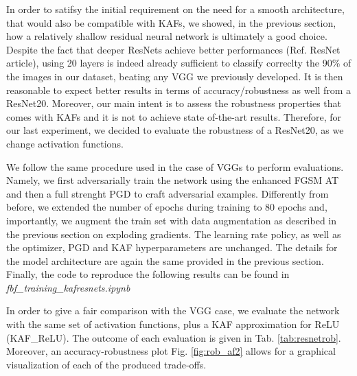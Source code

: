 \documentclass[LaM,binding=0.6cm]{./packages/sapthesis/sapthesis}
\begin{document}
        In order to satifsy the initial requirement on the need for a smooth architecture, that would also be compatible with KAFs, we showed, in the previous section, how a relatively shallow residual neural network is 
        ultimately a good choice. Despite the fact that deeper ResNets achieve better performances (Ref. ResNet article), using 20 layers is indeed already sufficient to classify correclty the 90\% of the images in our dataset, beating 
        any VGG we previously developed. It is then reasonable to expect better results in terms of accuracy/robustness as well from a ResNet20. Moreover, our main intent is to assess the robustness properties that comes with 
        KAFs and it is not to achieve state of-the-art results. Therefore, for our last experiment, we decided to evaluate the robustness of a ResNet20, as we change activation functions.

        We follow the same procedure used in the case of VGGs to perform evaluations. Namely, we first adversarially train the network using the enhanced FGSM AT and then a full strenght PGD to craft adversarial examples.
        Differently from before, we extended the number of epochs during training to 80 epochs and, importantly, we augment the train set with data augmentation as described in the previous section on exploding gradients.
        The learning rate policy, as well as the optimizer, PGD and KAF hyperparameters are unchanged. The details for the model architecture 
        are again the same provided in the previous section. Finally, the code to reproduce the following results can be found in \textit{fbf\_training\_kafresnets.ipynb}

        In order to give a fair comparison with the VGG case, we evaluate the network with the same set of activation functions, plus 
        a KAF approximation for ReLU (KAF\_ReLU). The outcome of each evaluation is given in Tab. \ref{tab:resnetrob}. Moreover, an accuracy-robustness
        plot Fig. \ref{fig:rob_af2} allows for a graphical visualization of each of the produced trade-offs.
\end{document}
